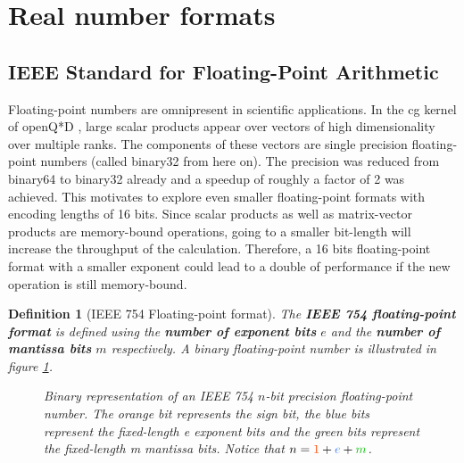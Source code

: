 \documentclass{article}
\theoremstyle{plain} %
\newtheorem{definition}{Definition}[section]
\theoremstyle{convention} %
\theoremstyle{remark} %
\def\df#1{\textbf{\textit{#1}}}
\numberwithin{equation}{section}
\begin{document}
\newpage

\section{Real number formats}

\label{sec:floats}

\subsection{IEEE Standard for Floating-Point Arithmetic}

Floating-point numbers are omnipresent in scientific applications. In the \acrfull{cg} kernel of openQ*D \cite{openqxd}, large scalar products appear over vectors of high dimensionality over multiple ranks. The components of these vectors are single precision floating-point numbers (called \gls{binary32} from here on). The precision was reduced from \gls{binary64} to \gls{binary32} already and a speedup of roughly a factor of 2 was achieved. This motivates to explore even smaller floating-point formats with encoding lengths of 16 bits. Since scalar products as well as matrix-vector products are memory-bound operations, going to a smaller bit-length will increase the throughput of the calculation. Therefore, a 16 bits floating-point format with a smaller exponent could lead to a double of performance if the new operation is still memory-bound.

\begin{definition}[IEEE 754 Floating-point format]

The \df{IEEE 754 floating-point format} \cite{ieee754_1985} is defined using the \df{number of exponent bits} $e$ and the \df{number of mantissa bits} $m$ respectively. A binary floating-point number is illustrated in figure \ref{fig:float}.

\begin{figure}[H]
  \caption{Binary representation of an IEEE 754 $n$-bit precision floating-point number. The \textcolor{corange}{orange} bit represents the \textcolor{corange}{sign bit}, the \textcolor{cblue}{blue} bits represent the fixed-length \textcolor{cblue}{e exponent bits} and the \textcolor{cgreen}{green} bits represent the fixed-length \textcolor{cgreen}{m mantissa bits}. Notice that $n = \textcolor{corange}{1} + \textcolor{cblue}{e} + \textcolor{cgreen}{m}$.}
  \label{fig:float}
\end{figure}

\end{definition}
\end{document}
